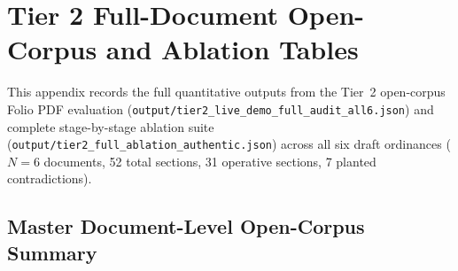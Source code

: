 \chapter[Tier 2 Open-Corpus Audit Results]{Tier 2 Full-Document Open-Corpus and Ablation Tables}
\label{app:tier2_full_results}

This appendix records the full quantitative outputs from the Tier~2 open-corpus Folio PDF evaluation (\texttt{output/tier2\_live\_demo\_full\_audit\_all6.json}) and complete stage-by-stage ablation suite (\texttt{output/tier2\_full\_ablation\_authentic.json}) across all six draft ordinances ($N = 6$ documents, 52 total sections, 31 operative sections, 7 planted contradictions).

\section{Master Document-Level Open-Corpus Summary}
\label{sec:app_tier2_summary_table}

